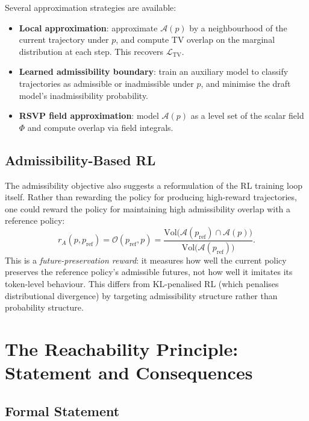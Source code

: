 \documentclass[11pt, a4paper, openany]{book}
\theoremstyle{plain}
\theoremstyle{definition}
\theoremstyle{remark}
\newcommand{\Vol}{\mathrm{Vol}}
\begin{document}
Several approximation strategies are available:
\begin{itemize}
  \item \textbf{Local approximation}: approximate $\mathcal{A}(p)$ by a
    neighbourhood of the current trajectory under $p$, and compute
    TV overlap on the marginal distribution at each step.
    This recovers $\mathcal{L}_{\mathrm{TV}}$.
  \item \textbf{Learned admissibility boundary}: train an auxiliary model
    to classify trajectories as admissible or inadmissible under $p$,
    and minimise the draft model's inadmissibility probability.
  \item \textbf{RSVP field approximation}: model $\mathcal{A}(p)$ as a
    level set of the scalar field $\Phi$ and compute overlap via field
    integrals.
\end{itemize}

\section{Admissibility-Based RL}

The admissibility objective also suggests a reformulation of the RL
training loop itself.
Rather than rewarding the policy for producing high-reward trajectories,
one could reward the policy for maintaining high admissibility overlap
with a reference policy:
\[
  r_A(p, p_{\mathrm{ref}}) = \mathcal{O}(p_{\mathrm{ref}}, p)
  = \frac{\Vol\!\bigl(\mathcal{A}(p_{\mathrm{ref}}) \cap \mathcal{A}(p)\bigr)}
         {\Vol\!\bigl(\mathcal{A}(p_{\mathrm{ref}})\bigr)}.
\]
This is a \emph{future-preservation reward}: it measures how well the
current policy preserves the reference policy's admissible futures,
not how well it imitates its token-level behaviour.
This differs from KL-penalised RL (which penalises distributional divergence)
by targeting admissibility structure rather than probability structure.

\chapter{The Reachability Principle: Statement and Consequences}
\label{ch:conclusion}

\section{Formal Statement}
\end{document}
